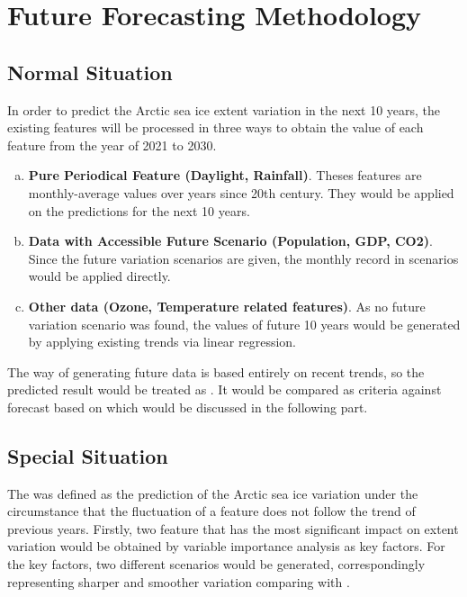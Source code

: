 \section{Future Forecasting Methodology} %
\subsection{Normal Situation} %
\label{sec:normal-predic}
In order to predict the Arctic sea ice extent variation in the next 10 years, the existing features will be processed in three ways to obtain the value of each feature from the year of 2021 to 2030.
\begin{enumerate}[(a)]
    \item 
        \textbf{Pure Periodical Feature (Daylight, Rainfall)}. Theses features are monthly-average values over years since 20th century. They would be applied on the predictions for the next 10 years.
        
    \item
        \textbf{Data with Accessible Future Scenario (Population, GDP, CO2)}. Since the future variation scenarios are given, the monthly record in scenarios would be applied directly.
    \item
        \textbf{Other data (Ozone, Temperature related features)}. As no future variation scenario was found, the values of future 10 years would be generated by applying existing trends via linear regression.
\end{enumerate}

The way of generating future data is based entirely on recent trends, so the predicted result would be treated as . It would be compared as criteria against forecast based on  which would be discussed in the following part.


\subsection{Special Situation} %
The  was defined as the prediction of the Arctic sea ice variation under the circumstance that the fluctuation of a feature does not follow the trend of previous years. Firstly, two feature that has the most significant impact on extent variation would be obtained by variable importance analysis as key factors. For the key factors, two different scenarios would be generated, correspondingly representing sharper and smoother variation comparing with .